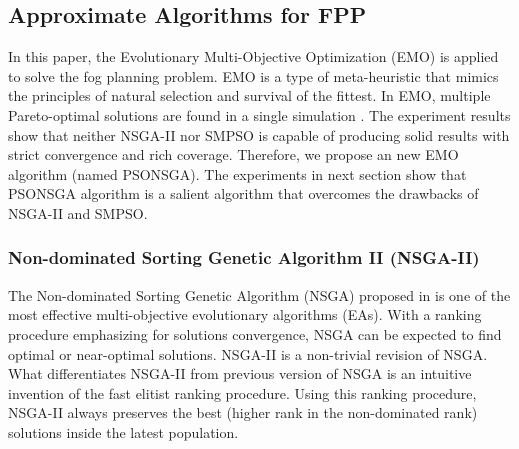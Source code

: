 \documentclass[10pt,journal,compsoc]{IEEEtran}
\begin{document}

\subsection{Approximate Algorithms for FPP}\label{sec:approximate}
In this paper, the Evolutionary Multi-Objective Optimization (EMO) is applied to solve the fog planning problem. EMO is a type of meta-heuristic that mimics the principles of natural selection and survival of the fittest. In EMO, multiple Pareto-optimal solutions are found in a single simulation \cite{Deb:2001:MOU:559152}. %
The experiment results show that neither NSGA-II nor SMPSO is capable of producing solid results with strict convergence and rich coverage. Therefore, we propose an new EMO algorithm (named PSONSGA). The experiments in next section show that PSONSGA algorithm is a salient algorithm that overcomes the drawbacks of NSGA-II and SMPSO.
\subsubsection{Non-dominated Sorting Genetic Algorithm II (NSGA-II)}
The Non-dominated Sorting Genetic Algorithm (NSGA) proposed in \cite{Deb:2002:FEM:2221359.2221582} is one of the most effective multi-objective evolutionary algorithms (EAs)\cite{fonseca1993genetic, rey1994niched}. With a ranking procedure emphasizing for solutions convergence, NSGA can be expected to find optimal or near-optimal solutions. NSGA-II is a non-trivial revision of NSGA. What differentiates NSGA-II from previous version of NSGA is an intuitive invention of the fast elitist ranking procedure. Using this ranking procedure, NSGA-II always preserves the best (higher rank in the non-dominated rank) solutions inside the latest population. 
\end{document}
